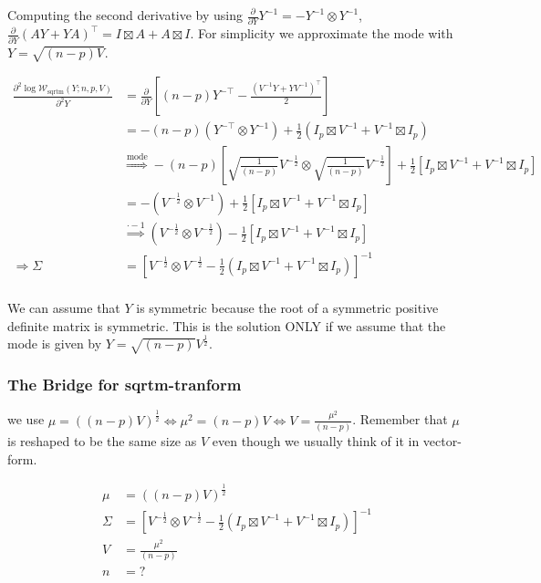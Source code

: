 Computing the second derivative by using $\frac{\partial}{\partial Y}Y^{-1} = -Y^{-1} \otimes Y^{-1}$, $\frac{\partial}{\partial Y} (AY + YA)^\top = I \boxtimes A + A \boxtimes I$. For simplicity we approximate the mode with $Y = \sqrt{(n-p)V}$. 

\begin{subequations}
\begin{align}
\frac{\partial^2 \log \mathcal{W}_{\text{sqrtm}}(Y; n,p,V)}{\partial^2 Y} &= \frac{\partial}{\partial Y} \left[(n-p)Y^{-\top} - \frac{(V^{-1}Y + YV^{-1})^\top}{2}\right] \\
&= -(n-p) (Y^{-\top} \otimes Y^{-1}) + \frac{1}{2}(I_p \boxtimes V^{-1} + V^{-1} \boxtimes I_p) \\
&\overset{\text{mode}}{\Rightarrow} -(n-p) \left[\sqrt{\frac{1}{(n-p)}}V^{-\frac{1}{2}} \otimes \sqrt{\frac{1}{(n-p)}}V^{-\frac{1}{2}}\right] + \frac{1}{2}\left[I_p \boxtimes V^{-1} + V^{-1} \boxtimes I_p\right] \\
&= - \left(V^{-\frac{1}{2}} \otimes V^{-1}\right) + \frac{1}{2}\left[I_p \boxtimes V^{-1} + V^{-1} \boxtimes I_p\right] \\
&\overset{\cdot -1}{\Rightarrow} \left(V^{-\frac{1}{2}} \otimes V^{-\frac{1}{2}}\right) - \frac{1}{2}\left[I_p \boxtimes V^{-1} + V^{-1} \boxtimes I_p\right] \\
\Rightarrow \Sigma &= \left[V^{-\frac{1}{2}} \otimes V^{-\frac{1}{2}} - \frac{1}{2}\left(I_p \boxtimes V^{-1} + V^{-1} \boxtimes I_p\right)\right]^{-1} \\
\end{align}
\end{subequations}

We can assume that $Y$ is symmetric because the root of a symmetric positive definite matrix is symmetric. 
This is the solution ONLY if we assume that the mode is given by $Y = \sqrt{(n-p)}V^{\frac{1}{2}}$. 

\subsubsection{The Bridge for sqrtm-tranform}

we use $\mu =  ((n-p)V)^{\frac{1}{2}} \Leftrightarrow \mu^2 = (n-p)V \Leftrightarrow V = \frac{\mu^2}{(n-p)}$. Remember that $\mu$ is reshaped to be the same size as $V$ even though we usually think of it in vector-form. 

\begin{subequations}
\begin{align}
	\mu &=  ((n-p)V)^{\frac{1}{2}} \\
	\Sigma &= \left[V^{-\frac{1}{2}} \otimes V^{-\frac{1}{2}} - \frac{1}{2}\left(I_p \boxtimes V^{-1} + V^{-1} \boxtimes I_p\right)\right]^{-1} \\
	V &= \frac{\mu^2}{(n-p)} \\
	n &= ?
\end{align}
\end{subequations}

